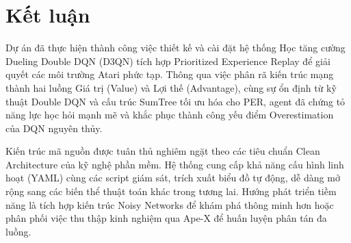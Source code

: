 \section{Kết luận}

Dự án đã thực hiện thành công việc thiết kế và cài đặt hệ thống Học tăng cường Dueling Double DQN (D3QN) tích hợp Prioritized Experience Replay để giải quyết các môi trường Atari phức tạp. Thông qua việc phân rã kiến trúc mạng thành hai luồng Giá trị (Value) và Lợi thế (Advantage), cùng sự ổn định từ kỹ thuật Double DQN và cấu trúc SumTree tối ưu hóa cho PER, agent đã chứng tỏ năng lực học hỏi mạnh mẽ và khắc phục thành công yếu điểm Overestimation của DQN nguyên thủy.

Kiến trúc mã nguồn được tuân thủ nghiêm ngặt theo các tiêu chuẩn Clean Architecture của kỹ nghệ phần mềm. Hệ thống cung cấp khả năng cấu hình linh hoạt (YAML) cùng các script giám sát, trích xuất biểu đồ tự động, dễ dàng mở rộng sang các biến thể thuật toán khác trong tương lai. Hướng phát triển tiềm năng là tích hợp kiến trúc Noisy Networks để khám phá thông minh hơn hoặc phân phối việc thu thập kinh nghiệm qua Ape-X để huấn luyện phân tán đa luồng.
